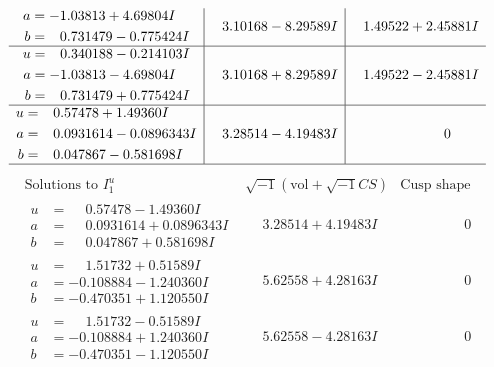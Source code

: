 \documentclass[1p]{elsarticle_modified}
\theoremstyle{definition}
\newcommand{\I}{\sqrt{-1}}
\begin{document}
$$\begin{array}{c|c|c}
\begin{aligned}
a &= -1.03813 + 4.69804 I \\
b &= \phantom{-}0.731479 - 0.775424 I\end{aligned}
 & \phantom{-}3.10168 - 8.29589 I & \phantom{-}1.49522 + 2.45881 I \\ \hline\begin{aligned}
u &= \phantom{-}0.340188 - 0.214103 I \\
a &= -1.03813 - 4.69804 I \\
b &= \phantom{-}0.731479 + 0.775424 I\end{aligned}
 & \phantom{-}3.10168 + 8.29589 I & \phantom{-}1.49522 - 2.45881 I \\ \hline\begin{aligned}
u &= \phantom{-}0.57478 + 1.49360 I \\
a &= \phantom{-}0.0931614 - 0.0896343 I \\
b &= \phantom{-}0.047867 - 0.581698 I\end{aligned}
 & \phantom{-}3.28514 - 4.19483 I & \phantom{-0.000000 } 0\\
 \hline 
 \end{array}$$\newpage$$\begin{array}{c|c|c}  
\text{Solutions to }I^u_{1}& \I (\text{vol} + \sqrt{-1}CS) & \text{Cusp shape}\\
 \hline 
\begin{aligned}
u &= \phantom{-}0.57478 - 1.49360 I \\
a &= \phantom{-}0.0931614 + 0.0896343 I \\
b &= \phantom{-}0.047867 + 0.581698 I\end{aligned}
 & \phantom{-}3.28514 + 4.19483 I & \phantom{-0.000000 } 0 \\ \hline\begin{aligned}
u &= \phantom{-}1.51732 + 0.51589 I \\
a &= -0.108884 - 1.240360 I \\
b &= -0.470351 + 1.120550 I\end{aligned}
 & \phantom{-}5.62558 + 4.28163 I & \phantom{-0.000000 } 0 \\ \hline\begin{aligned}
u &= \phantom{-}1.51732 - 0.51589 I \\
a &= -0.108884 + 1.240360 I \\
b &= -0.470351 - 1.120550 I\end{aligned}
 & \phantom{-}5.62558 - 4.28163 I & \phantom{-0.000000 } 0 \\ \hline\begin{aligned}

\end{aligned}
\end{array}$$
\end{document}
